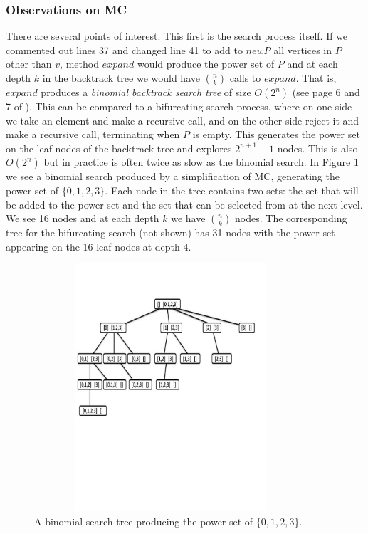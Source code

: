 \documentclass{l4proj}
\begin{document}
\subsubsection{Observations on MC}
There are several points of interest. This first is the search process itself. If we commented out lines 37 and changed
line 41 to add to $newP$ all vertices in $P$ other than $v$, method $expand$ would produce the power set of $P$ and
at each depth $k$ in the backtrack tree we would have $n \choose k$ calls to $expand$. That is, $expand$ produces a 
\emph{binomial backtrack search tree} of size $O(2^{n})$ (see page 6 and 7 of \cite{dek}). This can be compared to a bifurcating
search process, where on one side we take an element and make a recursive call, and on the other side reject it and
make a recursive call, terminating when $P$ is empty. This generates the power set on the
leaf nodes of the backtrack tree and explores $2^{n+1}-1$ nodes. This is also $O(2^{n})$ but in practice is 
often twice as slow as the binomial search. In Figure \ref{binomialTree} we see a binomial search produced
by a simplification of MC, generating the power set of $\{0,1,2,3\}$. Each node in the tree contains two sets: the set
that will be added to the power set and the set that can be selected from at the next level. We see 16 nodes and at each
depth $k$ we have $n \choose k$ nodes. The corresponding tree for the bifurcating search (not shown) has 31 nodes with the
power set appearing on the 16 leaf nodes at depth 4.

\begin{figure}
\centering
\includegraphics[height=9.2cm,width=10.2cm]{binomialTree.pdf}
\vspace{-35mm}
\caption{A binomial search tree producing the power set of $\{0,1,2,3\}$.}
\label{binomialTree}
\end{figure}
\end{document}
